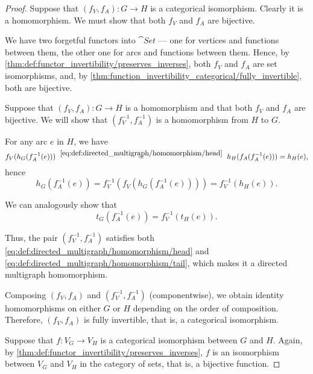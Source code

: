 \begin{proof}

  \SufficiencySubProof* Suppose that \( (f_V, f_A): G \to H \) is a categorical isomorphism. Clearly it is a homomorphism. We must show that both \( f_V \) and \( f_A \) are bijective.

  We have two forgetful functors into \( \cat{Set} \) --- one for vertices and functions between them, the other one for arcs and functions between them. Hence, by \cref{thm:def:functor_invertibility/preserves_inverses}, both \( f_V \) and \( f_A \) are set isomorphisms, and, by \cref{thm:function_invertibility_categorical/fully_invertible}, both are bijective.

  \NecessitySubProof* Suppose that \( (f_V, f_A): G \to H \) is a homomorphism and that both \( f_V \) and \( f_A \) are bijective. We will show that \( (f_V^{-1}, f_A^{-1}) \) is a homomorphism from \( H \) to \( G \).

  For any arc \( e \) in \( H \), we have
  \begin{equation*}
    f_V(h_G(f^{-1}_A(e)))
    \reloset {\eqref{eq:def:directed_multigraph/homomorphism/head}} =
    h_H(f_A(f^{-1}_A(e)))
    =
    h_H(e),
  \end{equation*}
  hence
  \begin{equation*}
    h_G(f^{-1}_A(e))
    =
    f_V^{-1}(f_V(h_G(f^{-1}_A(e))))
    =
    f_V^{-1}(h_H(e)).
  \end{equation*}

  We can analogously show that
  \begin{equation*}
    t_G(f^{-1}_A(e)) = f_V^{-1}(t_H(e)).
  \end{equation*}

  Thus, the pair \( (f_V^{-1},f_A^{-1}) \) satisfies both \eqref{eq:def:directed_multigraph/homomorphism/head} and \eqref{eq:def:directed_multigraph/homomorphism/tail}, which makes it a directed multigraph homomorphism.

  Composing \( (f_V, f_A) \) and \( (f_V^{-1}, f_A^{-1}) \) (componentwise), we obtain identity homomorphisms on either \( G \) or \( H \) depending on the order of composition. Therefore, \( (f_V, f_A) \) is fully invertible, that is, a categorical isomorphism.


  \SufficiencySubProof* Suppose that \( f: V_G \to V_H \) is a categorical isomorphism between \( G \) and \( H \). Again, by \cref{thm:def:functor_invertibility/preserves_inverses}, \( f \) is an isomorphism between \( V_G \) and \( V_H \) in the category of sets, that is, a bijective function.


\end{proof}
